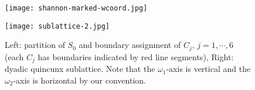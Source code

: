\begin{figure}[!t]
\centering
\begin{minipage}[c]{.42\textwidth}
\texttt{[image: shannon-marked-wcoord.jpg]}
\end{minipage}\hspace*{3em}
\begin{minipage}[c]{.3\textwidth}
\texttt{[image: sublattice-2.jpg]}
\vspace*{1em}
\end{minipage}
\caption{Left: partition of $S_0$ and boundary assignment of $C_j$, $j = 1,\cdots,6$ (each $C_j$ has boundaries indicated by red line segments), Right: dyadic quincunx sublattice. Note that the $\omega_1$-axis is vertical and the $\omega_2$-axis is horizontal by our convention.}
\label{fig: partition}
\vspace*{-5mm}
\end{figure}



